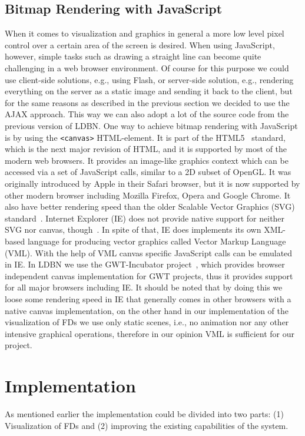 \subsection{Bitmap Rendering with JavaScript}
\label{sec:renderingJS}
When it comes to visualization and graphics in general a more low level 
pixel control over a certain area of the screen is desired. 
When using JavaScript, however, simple tasks such as drawing a straight
line can become quite challenging in a web browser environment.
Of course for this purpose we could use client-side solutions, e.g., 
using Flash, or server-side solution, e.g., 
rendering everything on the server as a static image 
and sending it back
to the client, but for the same reasons as described in the previous
section we decided to use the AJAX approach. This way we can also
adopt a lot of the source code from the previous version of LDBN. 
One way to achieve bitmap rendering with JavaScript is by
using the \verb=<canvas>= HTML-element. 
It is part of the HTML5~\cite{html5} standard, which is the next major revision of HTML, and it is supported by
most of the modern web browsers. It provides an image-like 
graphics context which can be accessed via a set of JavaScript calls, 
similar to a 2D subset of OpenGL. 
It was originally introduced by Apple in their Safari browser, but it is now 
supported by other modern browser including Mozilla Firefox, Opera and Google Chrome.
It also have  better rendering speed than the older Scalable Vector Graphics (SVG) standard~\cite{w8}. 
Internet Explorer (IE) does not 
provide native support for 
neither SVG nor canvas, though~\cite{w9}. In spite of that, IE does 
implements its own XML-based language for producing vector graphics 
called Vector Markup Language (VML). With the help of VML canvas specific JavaScript 
calls can be emulated in IE. In LDBN we use the GWT-Incubator project~\cite{gwtincubator}, which provides
browser independent canvas implementation for GWT projects, thus 
it provides support for all major browsers including IE. 
It should be noted that by doing this
we loose some rendering speed in IE that generally comes in other browsers
with a native canvas implementation, 
on the other hand in our implementation of the visualization of FDs we use only static scenes, i.e., 
no animation nor any other intensive 
graphical operations, therefore in our opinion VML is sufficient 
for our project. 

\section{Implementation}
\label{sec:implementation}
As mentioned earlier the implementation could be divided into two parts: 
(1) Visualization of FDs and 
(2) improving the existing capabilities of the system.

